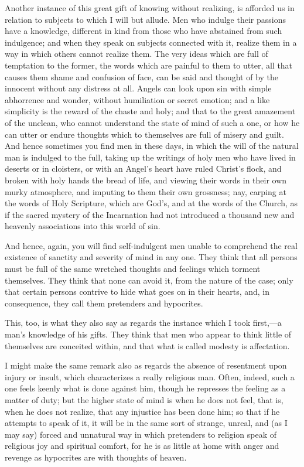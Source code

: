Another instance of this great gift of knowing without realizing,
is afforded us in relation to subjects to which I will but allude. Men
who indulge their passions have a knowledge, different in kind from
those who have abstained from such indulgence; and when they speak on
subjects connected with it, realize them in a way in which others
cannot realize them. The very ideas which are full of temptation to
the former, the words which are painful to them to utter, all that
causes them shame and confusion of face, can be said and thought of by
the innocent without any distress at all. Angels can look upon sin
with simple abhorrence and wonder, without humiliation or secret
emotion; and a like simplicity is the reward of the chaste and holy;
and that to the great amazement of the unclean, who cannot understand
the state of mind of such a one, or how he can utter or endure
thoughts which to themselves are full of misery and guilt. And hence
sometimes you find men in these days, in which the will of the natural
man is indulged to the full, taking up the writings of holy men who
have lived in deserts or in cloisters, or with an Angel's heart have
ruled Christ's flock, and broken with holy hands the bread of life,
and viewing their words in their own murky atmosphere, and imputing to
them their own grossness; nay, carping at the words of Holy Scripture,
which are God's, and at the words of the Church, as if the sacred
mystery of the Incarnation had not introduced a thousand new and
heavenly associations into this world of sin.

And hence, again, you will find self-indulgent men unable to
comprehend the real existence of sanctity and severity of mind in any
one. They think that all persons must be full of the same wretched
thoughts and feelings which torment themselves. They think that none
can avoid it, from the nature of the case; only that certain persons
contrive to hide what goes on in their hearts, and, in consequence,
they call them pretenders and hypocrites.

This, too, is what they also say as regards the instance which I
took first,—a man's knowledge of his gifts. They think that men who
appear to think little of themselves are conceited within, and that
what is called modesty is affectation.

I might make the same remark also as regards the absence of
resentment upon injury or insult, which characterizes a really
religious man. Often, indeed, such a one feels keenly what is done
against him, though he represses the feeling as a matter of duty; but
the higher state of mind is when he does not feel, that is, when he
does not realize, that any injustice has been done him; so that if he
attempts to speak of it, it will be in the same sort of strange,
unreal, and (as I may say) forced and unnatural way in which
pretenders to religion speak of religious joy and spiritual comfort,
for he is as little at home with anger and revenge as hypocrites are
with thoughts of heaven.

